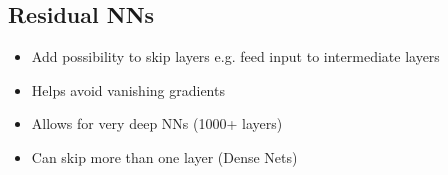 \subsection{Residual NNs}

\begin{itemize}
    \item Add possibility to skip layers e.g. feed input to intermediate layers
    \item Helps avoid vanishing gradients
    \item Allows for very deep NNs (1000+ layers)
    \item Can skip more than one layer (Dense Nets)
\end{itemize}
